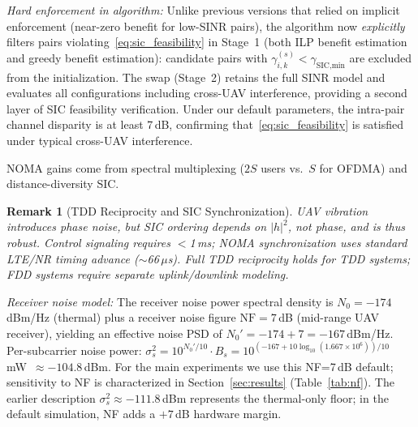 \documentclass[journal]{IEEEtran}
\newtheorem{remark}{Remark}
\begin{document}
\emph{Hard enforcement in algorithm:}
Unlike previous versions that relied on implicit enforcement (near-zero benefit for low-SINR pairs), the algorithm now \emph{explicitly} filters pairs violating~\eqref{eq:sic_feasibility} in Stage~1 (both ILP benefit estimation and greedy benefit estimation): candidate pairs with $\gamma_{i,k}^{(s)} < \gamma_{\text{SIC,min}}$ are excluded from the initialization. The swap (Stage~2) retains the full SINR model and evaluates all configurations including cross-UAV interference, providing a second layer of SIC feasibility verification.
Under our default parameters, the intra-pair channel disparity is at least 7\,dB, confirming that~\eqref{eq:sic_feasibility} is satisfied under typical cross-UAV interference.

NOMA gains come from spectral multiplexing ($2S$ users vs.\ $S$ for OFDMA) and distance-diversity SIC.

\begin{remark}[TDD Reciprocity and SIC Synchronization]
UAV vibration introduces phase noise, but SIC ordering depends on $|h|^2$, not phase, and is thus robust.
Control signaling requires $<$1\,ms; NOMA synchronization uses standard LTE/NR timing advance ($\sim$66\,$\mu$s).
Full TDD reciprocity holds for TDD systems; FDD systems require separate uplink/downlink modeling.
\end{remark}

\emph{Receiver noise model:}
The receiver noise power spectral density is $N_0 = -174$\,dBm/Hz (thermal) plus a receiver noise figure $\text{NF} = 7$\,dB (mid-range UAV receiver), yielding an effective noise PSD of $N_0' = -174 + 7 = -167$\,dBm/Hz.
Per-subcarrier noise power: $\sigma_s^2 = 10^{N_0'/10} \cdot B_s = 10^{(-167+10\log_{10}(1.667\times10^6))/10}$\,mW~$\approx -104.8$\,dBm.
For the main experiments we use this NF=7\,dB default; sensitivity to NF is characterized in Section~\ref{sec:results} (Table~\ref{tab:nf}).
The earlier description $\sigma_s^2 \approx -111.8$\,dBm represents the thermal-only floor; in the default simulation, NF adds a $+7$\,dB hardware margin.
\end{document}
